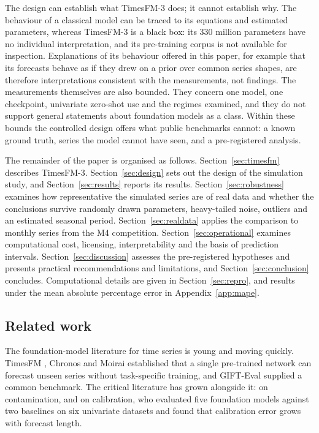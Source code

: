 \documentclass[11pt]{article}
\providecommand{\sectionref}[1]{Section~\ref{#1}}
\providecommand{\appendixref}[1]{Appendix~\ref{#1}}
\begin{document}
The design can establish what TimesFM-3 does; it cannot establish why. The behaviour of a classical
model can be traced to its equations and estimated parameters, whereas TimesFM-3 is a black box:
its 330 million parameters have no individual interpretation, and its pre-training corpus is not
available for inspection. Explanations of its behaviour offered in this paper, for example that
its forecasts behave as if they drew on a prior over common series shapes, are therefore
interpretations consistent with the measurements, not findings. The measurements themselves are
also bounded. They concern one model, one checkpoint, univariate zero-shot use and the regimes
examined, and they do not support general statements about foundation models as a class. Within
these bounds the controlled design offers what public benchmarks cannot: a known ground truth,
series the model cannot have seen, and a pre-registered analysis.

The remainder of the paper is organised as follows. \sectionref{sec:timesfm} describes
TimesFM-3. \sectionref{sec:design} sets out the design of the simulation study, and
\sectionref{sec:results} reports its results. \sectionref{sec:robustness} examines how
representative the simulated series are of real data and whether the conclusions survive randomly
drawn parameters, heavy-tailed noise, outliers and an estimated seasonal period.
\sectionref{sec:realdata} applies the comparison to
monthly series from the M4 competition. \sectionref{sec:operational} examines computational cost,
licensing, interpretability and the basis of prediction intervals. \sectionref{sec:discussion}
assesses the pre-registered hypotheses and presents practical recommendations and limitations,
and \sectionref{sec:conclusion} concludes. Computational details are given in
\sectionref{sec:repro}, and results under the mean absolute percentage error in
\appendixref{app:mape}.

\subsection{Related work}
\label{sec:related}

The foundation-model literature for time series is young and moving quickly. TimesFM
\citep{das2024timesfm}, Chronos \citep{ansari2024chronos} and Moirai \citep{woo2024moirai}
established that a single pre-trained network can forecast unseen series without task-specific
training, and GIFT-Eval \citep{aksu2024gifteval} supplied a common benchmark. The critical
literature has grown alongside it: \citet{meyer2025leakage} on contamination, and
\citet{adler2026calibrated} on calibration, who evaluated five foundation models against two
baselines on six univariate datasets and found that calibration error grows with forecast
length.
\end{document}
